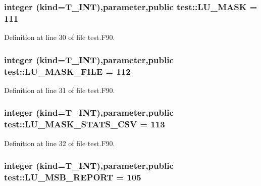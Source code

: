 \hypertarget{namespacetest_a6d15f5ccef6a1936e7fdfa3f785a97f7}{
\subsubsection[{LU\_\-MASK}]{\setlength{\rightskip}{0pt plus 5cm}integer (kind={\bf T\_\-INT}),parameter,public {\bf test::LU\_\-MASK} = 111}}
\label{namespacetest_a6d15f5ccef6a1936e7fdfa3f785a97f7}


Definition at line 30 of file test.F90.

\hypertarget{namespacetest_a4ef1befc57b809909da2a4f3bdb5853d}{
\subsubsection[{LU\_\-MASK\_\-FILE}]{\setlength{\rightskip}{0pt plus 5cm}integer (kind={\bf T\_\-INT}),parameter,public {\bf test::LU\_\-MASK\_\-FILE} = 112}}
\label{namespacetest_a4ef1befc57b809909da2a4f3bdb5853d}


Definition at line 31 of file test.F90.

\hypertarget{namespacetest_a494f7cd02f5647d3dd40276d2a080e09}{
\subsubsection[{LU\_\-MASK\_\-STATS\_\-CSV}]{\setlength{\rightskip}{0pt plus 5cm}integer (kind={\bf T\_\-INT}),parameter,public {\bf test::LU\_\-MASK\_\-STATS\_\-CSV} = 113}}
\label{namespacetest_a494f7cd02f5647d3dd40276d2a080e09}


Definition at line 32 of file test.F90.

\hypertarget{namespacetest_a72b7d2a48ea511f8adea59b1392f541c}{
\subsubsection[{LU\_\-MSB\_\-REPORT}]{\setlength{\rightskip}{0pt plus 5cm}integer (kind={\bf T\_\-INT}),parameter,public {\bf test::LU\_\-MSB\_\-REPORT} = 105}}
\label{namespacetest_a72b7d2a48ea511f8adea59b1392f541c}


